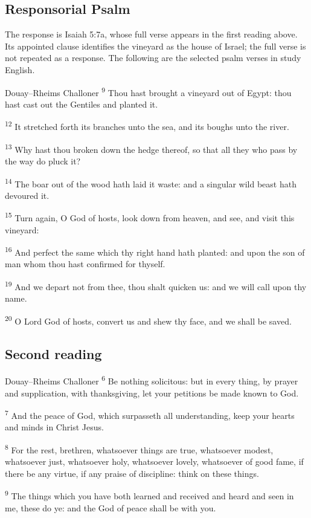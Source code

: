 \subsection{Responsorial Psalm}
\label{proper-responsorial-psalm}
The response is Isaiah 5:7a, whose full verse appears in the first reading above. Its appointed clause identifies the vineyard as the house of Israel; the full verse is not repeated as a response. The following are the selected psalm verses in study English.
\begin{englishwitness}{Douay--Rheims Challoner}
\textsuperscript{9} Thou hast brought a vineyard out of Egypt: thou hast cast out the Gentiles and planted it.

\textsuperscript{12} It stretched forth its branches unto the sea, and its boughs unto the river.

\textsuperscript{13} Why hast thou broken down the hedge thereof, so that all they who pass by the way do pluck it?

\textsuperscript{14} The boar out of the wood hath laid it waste: and a singular wild beast hath devoured it.

\textsuperscript{15} Turn again, O God of hosts, look down from heaven, and see, and visit this vineyard:

\textsuperscript{16} And perfect the same which thy right hand hath planted: and upon the son of man whom thou hast confirmed for thyself.

\textsuperscript{19} And we depart not from thee, thou shalt quicken us: and we will call upon thy name.

\textsuperscript{20} O Lord God of hosts, convert us and shew thy face, and we shall be saved.
\end{englishwitness}

\subsection{Second reading}
\label{proper-second-reading}

\begin{englishwitness}{Douay--Rheims Challoner}
\textsuperscript{6} Be nothing solicitous: but in every thing, by prayer and supplication, with thanksgiving, let your petitions be made known to God.

\textsuperscript{7} And the peace of God, which surpasseth all understanding, keep your hearts and minds in Christ Jesus.

\textsuperscript{8} For the rest, brethren, whatsoever things are true, whatsoever modest, whatsoever just, whatsoever holy, whatsoever lovely, whatsoever of good fame, if there be any virtue, if any praise of discipline: think on these things.

\textsuperscript{9} The things which you have both learned and received and heard and seen in me, these do ye: and the God of peace shall be with you.
\end{englishwitness}


